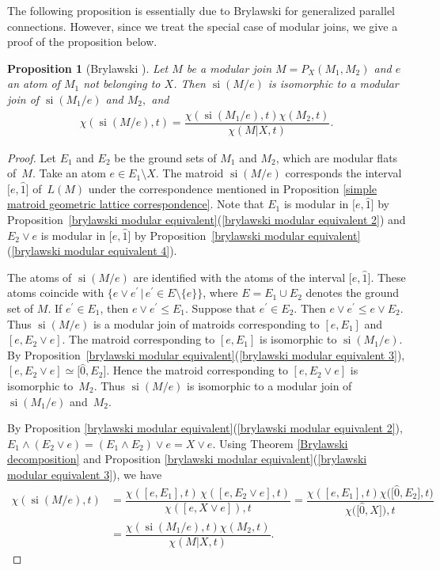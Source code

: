 \documentclass[pdftex]{sigma}
\numberwithin{equation}{section}
\newtheorem{Proposition}[Theorem]{Proposition}
 { \theoremstyle{definition}
\newtheorem{Definition}[Theorem]{Definition}
\newtheorem{Example}[Theorem]{Example}
\newtheorem{Remark}[Theorem]{Remark}
\newtheorem{Question}[Theorem]{Question} }
\DeclareMathOperator{\si}{si}
\begin{document}
The following proposition is essentially due to Brylawski for generalized parallel connections.
However, since we treat the special case of modular joins, we give a proof of the proposition below.
\begin{Proposition}[Brylawski {\cite[Theorem 5.11.4]{brylawski1975modular-totams}}]\label{Brylawski contraction}
Let $ M $ be a modular join $ M=P_{X}(M_{1},M_{2}) $ and $ e $ an atom of $ M_{1} $ not belonging to $ X $.
Then $ \si(M/e) $ is isomorphic to a modular join of $ \si(M_{1}/e) $ and $ M_{2}, $ and
\begin{align*}
\chi(\si(M/e),t) = \dfrac{\chi(\si(M_{1}/e),t) \chi(M_{2}, t)}{\chi(M|X, t)}.
\end{align*}
\end{Proposition}
\begin{proof}
Let $ E_{1} $ and $ E_{2} $ be the ground sets of $ M_{1} $ and $ M_{2} $, which are modular flats of~$ M $.
Take an atom $ e \in E_{1} \setminus X $.
The matroid $ \si(M/e) $ corresponds the interval $ \big[e, \hat{1}\big] $ of~$ L(M) $ under the correspondence mentioned in Proposition \ref{simple matroid geometric lattice correspondence}.
Note that $ E_{1} $ is modular in $ \big[e, \hat{1}\big] $ by Proposition~\ref{brylawski modular equivalent}(\ref{brylawski modular equivalent 2}) and $ E_{2} \vee e $ is modular in $ \big[e, \hat{1}\big] $ by Proposition~\ref{brylawski modular equivalent}(\ref{brylawski modular equivalent 4}).

The atoms of $ \si(M/e) $ are identified with the atoms of the interval $ \big[e, \hat{1}\big] $.
These atoms coincide with $ \{ e \vee e^{\prime} \,|\, e^{\prime} \in E\setminus \{e\} \} $, where $ E = E_{1} \cup E_{2} $ denotes the ground set of $ M $.
If $ e^{\prime} \in E_{1} $, then $ e \vee e^{\prime} \leq E_{1} $.
Suppose that $ e^{\prime} \in E_{2} $.
Then $ e \vee e^{\prime} \leq e \vee E_{2} $.
Thus $ \si(M/e) $ is a modular join of matroids corresponding to $ [e, E_{1}] $ and $ [e, E_{2} \vee e] $.
The matroid corresponding to $ [e, E_{1}] $ is isomorphic to $ \si(M_{1}/e) $.
By Proposition~\ref{brylawski modular equivalent}(\ref{brylawski modular equivalent 3}), $ [e, E_{2} \vee e] \simeq \big[\hat{0}, E_{2}\big] $. Hence the matroid corresponding to $ [e, E_{2} \vee e] $ is isomorphic to~$ M_{2} $.
Thus $ \si(M/e) $ is isomorphic to a modular join of $ \si(M_{1}/e) $ and~$ M_{2} $.

By Proposition \ref{brylawski modular equivalent}(\ref{brylawski modular equivalent 2}), $ E_{1} \wedge (E_{2} \vee e) = (E_{1} \wedge E_{2}) \vee e = X \vee e $.
Using Theorem \ref{Brylawski decomposition} and Proposition \ref{brylawski modular equivalent}(\ref{brylawski modular equivalent 3}), we have
\begin{align*}
\chi(\si(M/e),t)& = \dfrac{\chi([e, E_{1}],t) \, \chi([e, E_{2}\vee e], t)}{\chi([e,X \vee e]), t}
= \dfrac{\chi([e, E_{1}],t) \chi\big(\big[\hat{0}, E_{2}\big], t\big)}{\chi\big(\big[\hat{0},X\big]\big), t} \\
&= \dfrac{\chi(\si(M_{1}/e),t) \chi(M_{2}, t)}{\chi(M|X, t)}.\tag*{\qed}
\end{align*}\renewcommand{\qed}{}
\end{proof}
\end{document}
